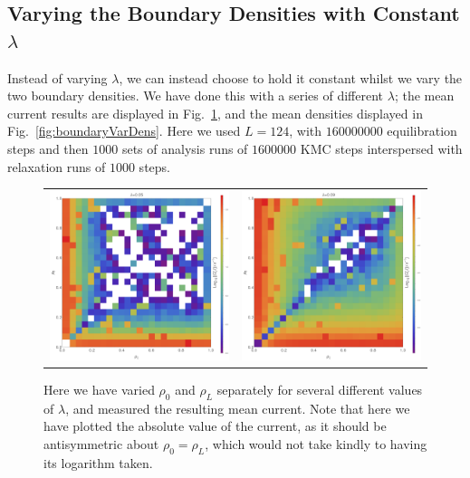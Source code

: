 \subsection{Varying the Boundary Densities with Constant $\lambda$}
Instead of varying $\lambda$, we can instead choose to hold it constant whilst we vary the two
boundary densities. We have done this with a series of different $\lambda$; the mean current results
are displayed in Fig.~\ref{fig:boundaryVarCurr}, and the mean densities displayed in 
Fig.~\ref{fig:boundaryVarDens}. Here we used $L=124$, with $160000000$ equilibration steps and then
$1000$ sets of analysis runs of $1600000$ KMC steps interspersed with relaxation runs of 
$1000$ steps.
\begin{figure} \caption[Mean currents observed when varying the boundary densities, fixing $\lambda$,
for different $\lambda$]{Here we have varied $\rho_0$ and $\rho_L$ separately for several different 
values of $\lambda$, and measured the resulting mean current. Note that here we have plotted the 
absolute value of the current, as it should be antisymmetric about $\rho_0 = \rho_L$, which would
not take kindly to having its logarithm taken.} 
\label{fig:boundaryVarCurr}
\begin{center}
\begin{tabular}{c c} 
\includegraphics[width=0.49\linewidth]{numerics/images/concFrames/concDataCurr0p05.png} &
\includegraphics[width=0.49\linewidth]{numerics/images/concFrames/concDataCurr0p09.png} \\

\end{tabular}
\end{center}
\end{figure}
